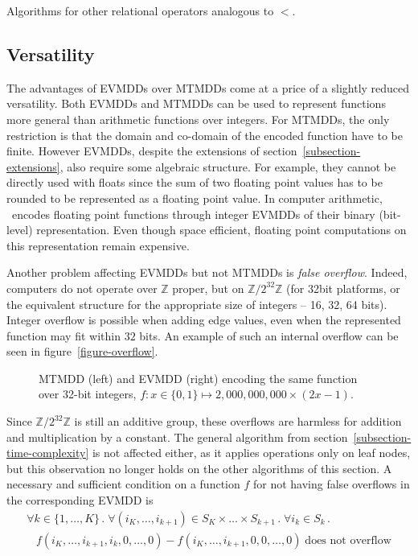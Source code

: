 \documentclass[a4paper,oneside,11pt,pdftex]{llncs}
\newcommand{\Z}{\mathbb{Z}}
\newcommand{\m}{\mbox}
\begin{document}
Algorithms for other relational operators analogous to $<$.

\subsection{Versatility}

The advantages of EVMDDs over MTMDDs come at a price of a slightly reduced versatility.
Both EVMDDs and MTMDDs can be used to represent functions more general than 
arithmetic functions over integers. For MTMDDs, the only restriction is that
the domain and co-domain of the encoded function have to be finite.
However EVMDDs, despite the extensions of section~\vref{subsection-extensions},
also require some algebraic structure. For example, they cannot be directly used
with floats since the sum of two floating point values has to be rounded to
be represented as a floating point value.
In computer arithmetic, \cite{Sasao2009}~encodes floating point functions
through integer EVMDDs of their binary (bit-level) representation. 
Even though space efficient, floating point computations on this representation remain expensive.

Another problem affecting EVMDDs but not MTMDDs is \emph{false overflow}.
Indeed, computers do not operate over $\Z$ proper, but on $\Z/2^{32}\Z$ (for 32bit platforms,
or the equivalent structure for the appropriate size of integers -- 16, 32, 64 bits).
Integer overflow is possible when adding edge values, even when the represented function
may fit within $32$ bits. An example of such an internal overflow
can be seen in figure~\vref{figure-overflow}.
\begin{figure}[htbp]
  \centering
    
  \caption{MTMDD (left) and EVMDD (right) encoding the same function over 32-bit integers,
$f : x \in \{0, 1\} \mapsto 2,000,000,000\times(2x-1)$.}
\label{figure-overflow}
\end{figure}
Since $\Z/2^{32}\Z$ is still an additive group, these overflows are harmless
for addition and multiplication by a constant. The general algorithm from 
section~\vref{subsection-time-complexity} is not affected either, as it applies
operations only on leaf nodes, but this observation no longer holds on 
the other algorithms of this section.
A necessary and sufficient condition on a function $f$ for not having false overflows in 
the corresponding EVMDD is
$$
\begin{array}{l}
\forall k \in \{1,\ldots, K\} \,.\; \forall (i_K,\ldots,i_{k+1}) \in S_K \times \ldots \times S_{k+1} \,.\; \forall i_k \in S_k \,.\;\\
\;\;\; f(i_K,\ldots, i_{k+1}, i_k, 0,\ldots, 0) - f(i_K,\ldots, i_{k+1}, 0, 0,\ldots, 0) \; \m{does not overflow}
\end{array}
$$
\end{document}
